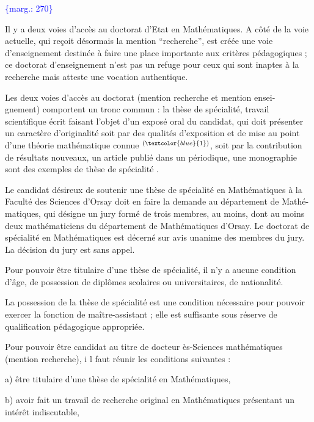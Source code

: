 \documentclass[11pt]{article}
\newcommand{\scanpage}[1]{\par\bigskip\noindent{\small\sffamily[scan #1]}\par}
\newcommand{\hand}[1]{\textcolor{blue}{#1}}
\newcommand{\margin}[1]{\textcolor{blue}{\{\textsf{marg.:} #1\}}}
\begin{document}
\margin{270}

\clearpage
\scanpage{119/272}
Il y a deux voies d'accès au doctorat d'Etat en Mathématiques.
A côté de la voie actuelle, qui reçoit désormais la mention ``recherche'',
est créée une voie d'enseignement destinée à faire une place importante aux critères
pédagogiques ; ce doctorat d'enseignement n'est pas un refuge pour ceux qui sont
inaptes à la recherche mais atteste une vocation authentique.

Les deux voies d'accès au doctorat (mention recherche et mention ensei-%
gnement) comportent un tronc commun : la thèse de spécialité, travail scientifique
écrit faisant l'objet d'un exposé oral du candidat, qui doit présenter un caractère
d'originalité soit par des qualités d'exposition et de mise au point d'une théorie
mathématique connue $^{(\hand{1})}$, soit par la contribution de résultats nouveaux, un article
publié dans un périodique, une monographie sont des exemples de thèse de spécialité .

Le candidat désireux de soutenir une thèse de spécialité en Mathématiques
à la Faculté des Sciences d'Orsay doit en faire la demande au département de Mathé-%
matiques, qui désigne un jury formé de trois membres, au moins, dont au moins deux
mathématiciens du département de Mathématiques d'Orsay. Le doctorat de spécialité
en Mathématiques est décerné sur avis unanime des membres du jury. La décision du
jury est sans appel.

Pour pouvoir être titulaire d'une thèse de spécialité, il n'y a aucune
condition d'âge, de possession de diplômes scolaires ou universitaires, de nationalité.

La possession de la thèse de spécialité est une condition nécessaire pour
pouvoir exercer la fonction de maître-assistant ; elle est suffisante sous réserve
de qualification pédagogique appropriée.

Pour pouvoir être candidat au titre de docteur ès-Sciences mathématiques
(mention recherche), i l faut réunir les conditions suivantes :

a) être titulaire d'une thèse de spécialité en Mathématiques,

b) avoir fait un travail de recherche original en Mathématiques présentant
un intérêt indiscutable,
\end{document}
